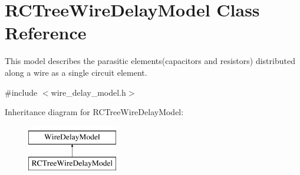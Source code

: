 \hypertarget{classRCTreeWireDelayModel}{\section{R\-C\-Tree\-Wire\-Delay\-Model Class Reference}
\label{classRCTreeWireDelayModel}
}


This model describes the parasitic elements(capacitors and resistors) distributed along a wire as a single circuit element.  




{\ttfamily \#include $<$wire\-\_\-delay\-\_\-model.\-h$>$}

Inheritance diagram for R\-C\-Tree\-Wire\-Delay\-Model\-:\begin{figure}[H]
\begin{center}
\leavevmode
\includegraphics[height=2.000000cm]{classRCTreeWireDelayModel}
\end{center}
\end{figure}
